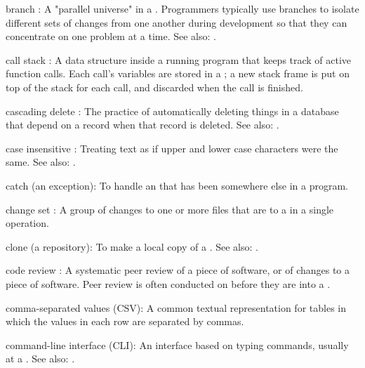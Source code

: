 \documentclass{book}
\begin{document}
\begin{swcdescription}
\item[branch]:
A "parallel universe" in a  .
Programmers typically use branches to isolate different sets of changes from one another during development
so that they can concentrate on one problem at a time.
See also: .

\item[call stack]:
A data structure inside a running program that
keeps track of active function calls. Each call's variables are stored
in a ; a new stack frame is put on
top of the stack for each call, and discarded when the call is finished.

\item[cascading delete]:
The practice of automatically deleting things
in a database that depend on a record when that record is deleted. See
also: .

\item[case insensitive]:
Treating text as if upper and lower case
characters were the same. See also: .
 
\item[catch] (an exception):
To handle an  that has been 
somewhere else in a program.

\item[change set]:
A group of changes to one or more files that are
 to a   in a single operation.

\item[clone] (a repository):
To make a local copy of a  .
See also: .

\item[code review]:
A systematic peer review of a piece of software,
or of changes to a piece of software.
Peer review is often conducted on 
before they are  into a .

\item[comma-separated values] (CSV):
A common textual representation
for tables in which the values in each row are separated by commas.

\item[command-line interface] (CLI):
An interface based on typing
commands, usually at a . See also:
.


\end{swcdescription}
\end{document}
